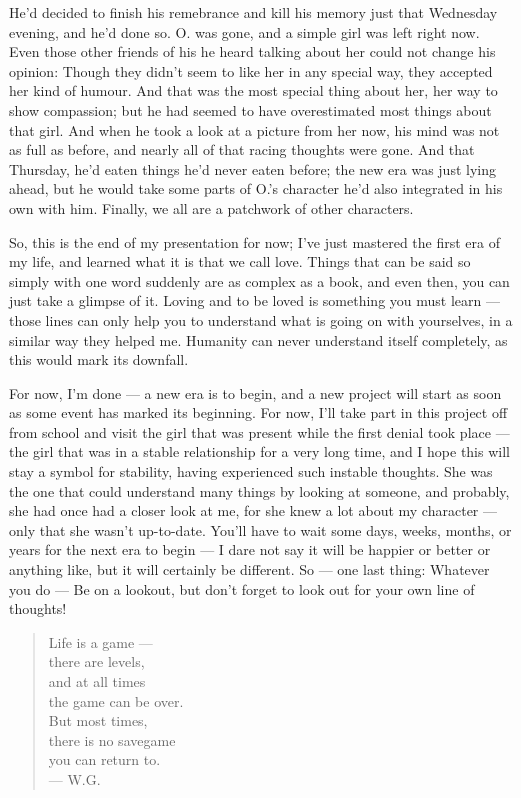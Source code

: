 He'd decided to finish his remebrance and kill his memory just that Wednesday evening, and he'd done so. O. was gone, and a simple girl was left right now.
Even those other friends of his he heard talking about her could not change his opinion: Though they didn't seem to like her in any special way, they accepted her kind of humour. 
And that was the most special thing about her, her way to show compassion; but he had seemed to have overestimated most things about that girl. And when he took a look at a picture from her now, his mind was not as full as before, and nearly all of that racing thoughts were gone. And that Thursday, he'd eaten things he'd never eaten before; the new era was just lying ahead, but he would take some parts of O.'s character he'd also integrated in his own with him. Finally, we all are a patchwork of other characters.

So, this is the end of my presentation for now; I've just mastered the first era of my life, and learned what it is that we call love. Things that can be said so simply with one word suddenly are as complex as a book, and even then, you can just take a glimpse of it. Loving and to be loved is something you must learn --- those lines can only help you to understand what is going on with yourselves, in a similar way they helped me. Humanity can never understand itself completely, as this would mark its downfall.

For now, I'm done --- a new era is to begin, and a new project will start as soon as some event has marked its beginning. For now, I'll take part in this project off from school and visit the girl that was present while the first denial took place --- the girl that was in a stable relationship for a very long time, and I hope this will stay a symbol for stability, having experienced such instable thoughts. She was the one that could understand many things by looking at someone, and probably, she had once had a closer look at me, for she knew a lot about my character --- only that she wasn't up-to-date. 
You'll have to wait some days, weeks, months, or years for the next era to begin --- I dare not say it will be happier or better or anything like, but it will certainly be different. 
So --- one last thing: Whatever you do --- Be on a lookout, but don't forget to look out for your own line of thoughts! 

\begin{quote}
Life is a game --- \\
there are levels, \\
and at all times \\
the game can be over. \\
But most times, \\
there is no savegame \\
you can return to. \\
--- W.G.
\end{quote}

